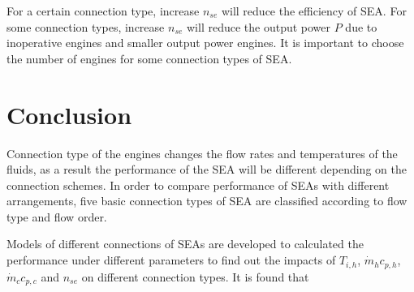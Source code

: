 For a certain connection type, increase $n_{se}$ will reduce the efficiency of SEA. For some connection types, increase $n_{se}$ will reduce the output power $P$ due to inoperative engines and smaller output power engines. It is important to choose the number of engines for some connection types of SEA. 

\section{Conclusion}

Connection type of the engines changes the flow rates and temperatures of the fluids, as a result the performance of the SEA will be different depending on the connection schemes. In order to compare performance of SEAs with different arrangements, five basic connection types of SEA are classified according to flow type and flow order. 


Models of different connections of SEAs are developed to calculated the performance under different parameters to find out the impacts of $T_{i,h}$, $\dot{m}_hc_{p,h}$, $\dot{m}_cc_{p,c}$ and $n_{se}$ on different connection types. It is found that

